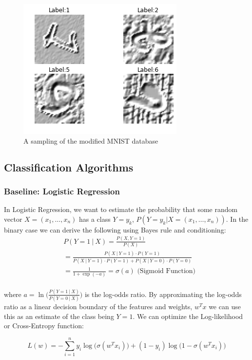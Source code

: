 \documentclass[conference]{IEEEtran}
\begin{document}
\begin{figure}[h]
	\centering
	\includegraphics[scale=0.40]{sample_of_images.png}
	\caption{A sampling of the modified MNIST database}
	\label{MNISTSample}
\end{figure}

\subsection{Classification Algorithms}

\subsubsection{Baseline: Logistic Regression}
In Logistic Regression, we want to estimate the probability that some random vector $X=(x_1, \ldots, x_n)$ has a class $Y=y_k$, $P(Y=y_k | X=(x_1, \ldots, x_n))$. In the binary case we can derive the following using Bayes rule and conditioning:
\begin{equation*}
\begin{split}
&P(Y=1~|~X) = \frac{P(X, Y=1)}{P(X)}\\
&= \frac{ P(X~|~Y=1)\cdot P(Y=1) }{ P(X~|~Y=1)\cdot P(Y=1) + P(X~|~Y=0)\cdot P(Y=0) }\\
& = \frac{1}{1 + \exp{(-a)}} = \sigma(a) \text{~(Sigmoid Function)}\\
\end{split}
\end{equation*}

where $a=\ln\Big(\frac{P(Y=1~|~X)}{P(Y=0~|~X)}\Big)$ is the log-odds ratio. By approximating the log-odds ratio as a linear decision boundary of the features and weights, $w^T x$ we can use this as an estimate of the class being $Y=1$. We can optimize the Log-likelihood or Cross-Entropy function:

\begin{equation}
	\label{LL}
	L(w) = -\sum_{i=1}^n y_i\log\Big(\sigma(w^Tx_i)\Big) + (1-y_i)\log\Big(1-\sigma(w^Tx_i)\Big)
\end{equation}
\end{document}
